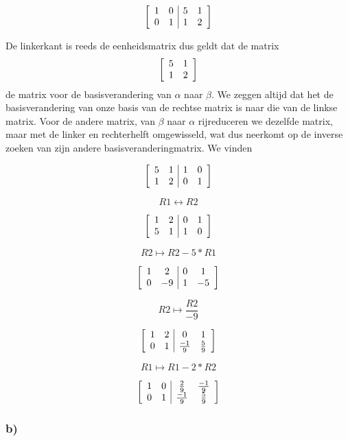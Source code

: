 \documentclass[lineaire_algebra_oplossingen.tex]{subfiles}
\begin{document}
\[
\left[
\begin{array}{ c c | c c }
1 & 0 & 5 & 1\\
0 & 1 & 1 & 2
\end{array}
\right]
\]

De linkerkant is reeds de eenheidsmatrix dus geldt dat de matrix 
\[
\left[
\begin{array}{ c c }
5 & 1\\
1 & 2
\end{array}
\right]
\]
de matrix voor de basisverandering van $\alpha$ naar $\beta$. We zeggen altijd dat het de basisverandering van onze basis van de rechtse matrix is naar die van de linkse matrix. Voor de andere matrix, van $\beta$ naar $\alpha$ rijreduceren we dezelfde matrix, maar met de linker en rechterhelft omgewisseld, wat dus neerkomt op de inverse zoeken van zijn andere basisveranderingmatrix. We vinden

\[
\left[
\begin{array}{ c c | c c }
5 & 1 & 1 & 0\\
1 & 2 & 0 & 1
\end{array}
\right]
\]

\[R1 \leftrightarrow R2 \]

\[
\left[
\begin{array}{ c c | c c }
1 & 2 & 0 & 1\\
5 & 1 & 1 & 0
\end{array}
\right]
\]

\[R2 \mapsto R2 - 5*R1 \]

\[
\left[
\begin{array}{ c c | c c }
1 & 2 & 0 & 1\\
0 & -9 & 1 & -5
\end{array}
\right]
\]

\[R2 \mapsto \frac{R2}{-9} \]

\[
\left[
\begin{array}{ c c | c c }
1 & 2 & 0 & 1\\
0 & 1 & \frac{-1}{9} & \frac{5}{9}
\end{array}
\right]
\]

\[R1 \mapsto R1 - 2*R2 \]

\[
\left[
\begin{array}{ c c | c c }
1 & 0 & \frac{2}{9} & \frac{-1}{9}\\
0 & 1 & \frac{-1}{9} & \frac{5}{9}
\end{array}
\right]
\]

\subsubsection*{b)}
\end{document}
